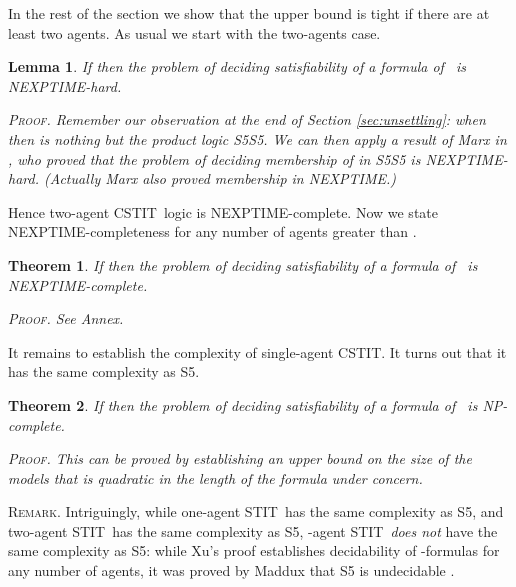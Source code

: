 \documentclass{article}
\newtheorem{theorem}{Theorem}
\newtheorem{lemma}{Lemma}
\newenvironment{remark}{\medskip\noindent \textsc{Remark.}} {\medskip}
\newenvironment{pf}{\em \medskip\noindent \textsc{Proof.}}
{\hspace*{\fill}\nolinebreak[2]\hspace*{\fill}\medskip}
\newcommand{\STIT} {{\textsf{STIT}}}              \newcommand{\CSTIT}{{\textsf{CSTIT}}}            \newcommand{\DSTIT}{{\textsf{DSTIT}}}
\newcommand{\LCSTIT}{}
\begin{document}
In the rest of the section we show that the upper bound is tight
if there are at least two agents. As usual we start with the two-agents case.

\begin{lemma}\label{lem:ComplexCstitLowerTwoAgents}
If  then the problem of deciding satisfiability of
a formula of \LCSTIT\ is NEXPTIME-hard.

\begin{pf}
Remember our observation at the end of Section \ref{sec:unsettling}:
when  then 
is nothing but the product logic S5S5.
We can then apply a result of Marx in \cite{Marx99}, who proved that the problem of
deciding membership of  in S5S5 is NEXPTIME-hard.
(Actually Marx also proved membership in NEXPTIME.)
\end{pf}
\end{lemma}

Hence two-agent \CSTIT\ logic is NEXPTIME-complete.
Now we state NEXPTIME-completeness for any number of agents greater than .



\begin{theorem}\label{theo:cstitNexptComplete}
If  then the problem of deciding satisfiability
of a formula of \LCSTIT\ is NEXPTIME-complete.

\begin{pf}
See Annex.
\end{pf}

\end{theorem}

It remains to establish the complexity of single-agent \CSTIT.
It turns out that it has the same complexity as S5.

\begin{theorem}\label{theo:cstitSingleagentNpComplete}
If  then the problem of deciding satisfiability
of a formula of \LCSTIT\ is NP-complete.

\begin{pf}
This can be proved by establishing an upper bound on the size of the models that is
quadratic in the length of the formula under concern.
\end{pf}

\end{theorem}

\begin{remark}
Intriguingly, while one-agent \STIT\ has the same complexity as S5, and
two-agent \STIT\ has the same complexity as S5,
-agent \STIT\ \emph{does not} have the same complexity as S5:
while Xu's proof establishes decidability of \LCSTIT-formulas for any number of agents,
it was proved by Maddux that S5 is undecidable \cite{MarxMikulas00}.
\end{remark}
\end{document}
